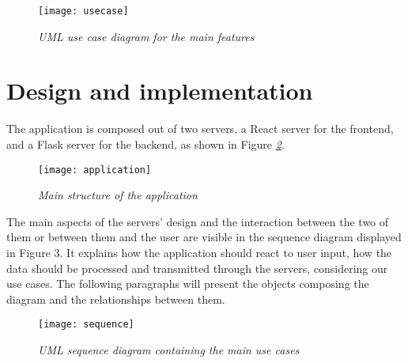 \begin{figure}[H]
  \centering
  \texttt{[image: usecase]}
  \caption{\emph{UML use case diagram for the main features}}
  \label{fig:usecase}
\end{figure}



\section{Design and implementation}

The application is composed out of two servers,
a React server for the frontend,
and a Flask server for the backend,
as shown in Figure \emph{\ref{fig:application}}.

\begin{figure}[H]
  \centering
  \texttt{[image: application]}
  \caption{\emph{Main structure of the application}}
  \label{fig:application}
\end{figure}


The main aspects of the servers' design and the
interaction between the two of them or between them and
the user are visible in the sequence diagram displayed in Figure 3.
It explains how the application should react to user input,
how the data should be processed and transmitted through the servers,
considering our use cases.
The following paragraphs will present the objects composing the
diagram and the relationships between them.

\begin{figure}[H]
  \centering
  \texttt{[image: sequence]}
  \caption{\emph{UML sequence diagram containing the main use cases}}
  \label{fig:sequence}
\end{figure}


